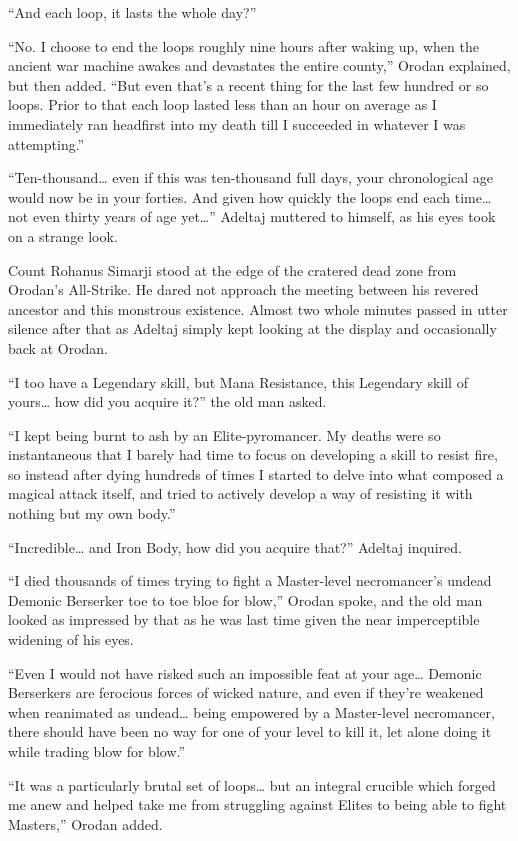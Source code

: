 \documentclass[a4paper,10pt]{book}
\begin{document}
“And each loop, it lasts the whole day?”\par
“No. I choose to end the loops roughly nine hours after waking up, when the ancient war machine awakes and devastates the entire county,” Orodan explained, but then added. “But even that’s a recent thing for the last few hundred or so loops. Prior to that each loop lasted less than an hour on average as I immediately ran headfirst into my death till I succeeded in whatever I was attempting.”\par
“Ten-thousand… even if this was ten-thousand full days, your chronological age would now be in your forties. And given how quickly the loops end each time… not even thirty years of age yet…” Adeltaj muttered to himself, as his eyes took on a strange look.\par
Count Rohanus Simarji stood at the edge of the cratered dead zone from Orodan’s All-Strike. He dared not approach the meeting between his revered ancestor and this monstrous existence. Almost two whole minutes passed in utter silence after that as Adeltaj simply kept looking at the display and occasionally back at Orodan.\par
“I too have a Legendary skill, but Mana Resistance, this Legendary skill of yours… how did you acquire it?” the old man asked.\par
“I kept being burnt to ash by an Elite-pyromancer. My deaths were so instantaneous that I barely had time to focus on developing a skill to resist fire, so instead after dying hundreds of times I started to delve into what composed a magical attack itself, and tried to actively develop a way of resisting it with nothing but my own body.”\par
“Incredible… and Iron Body, how did you acquire that?” Adeltaj inquired.\par
“I died thousands of times trying to fight a Master-level necromancer’s undead Demonic Berserker toe to toe bloe for blow,” Orodan spoke, and the old man looked as impressed by that as he was last time given the near imperceptible widening of his eyes.\par
“Even I would not have risked such an impossible feat at your age… Demonic Berserkers are ferocious forces of wicked nature, and even if they’re weakened when reanimated as undead… being empowered by a Master-level necromancer, there should have been no way for one of your level to kill it, let alone doing it while trading blow for blow.”\par
“It was a particularly brutal set of loops… but an integral crucible which forged me anew and helped take me from struggling against Elites to being able to fight Masters,” Orodan added.\par
\end{document}
